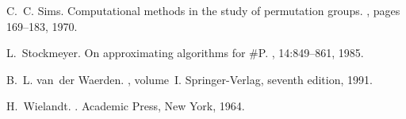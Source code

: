 \documentclass{article}
\begin{document}
\begin{thebibliography}{10}
C.~C. Sims.
\newblock Computational methods in the study of permutation groups.
, pages 169--183,
  1970.

L.~Stockmeyer.
\newblock On approximating algorithms for \#{P}.
, 14:849--861, 1985.

B.~L. van~der Waerden.
, volume~I.
\newblock Springer-Verlag, seventh edition, 1991.

H.~Wielandt.
.
\newblock Academic Press, New York, 1964.

\end{thebibliography}
\end{document}
